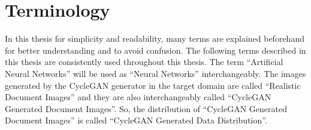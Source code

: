 \section{Terminology}\label{terminology}

In this thesis for simplicity and readability, many terms are explained beforehand for better understanding and to avoid confusion. The following terms described in this thesis are consistently used throughout this thesis. The term ``Artificial Neural Networks'' will be used as ``Neural Networks'' interchangeably. The images generated by the \ac{CycleGAN} generator in the target domain are called ``Realistic Document Images'' and they are also interchangeably called ``\ac{CycleGAN} Generated Document Images''.
So, the distribution of ``\ac{CycleGAN} Generated Document Images'' is called ``\ac{CycleGAN} Generated Data Distribution''.

















